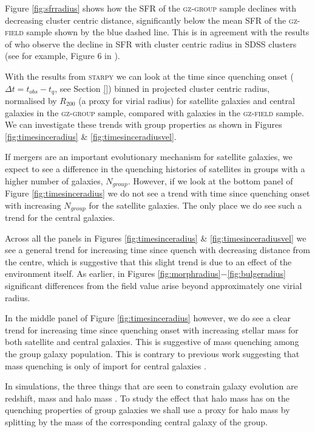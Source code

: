 \documentclass[useAMS,usenatbib]{mn2e}
\def\starpy ~{\textsc{starpy}}
\begin{document}
Figure \ref{fig:sfrradius} shows how the SFR of the \textsc{gz-group} sample declines with decreasing cluster centric distance, significantly below the mean SFR of the \textsc{gz-field} sample shown by the blue dashed line. This is in agreement with the results of \cite{gomez03} who observe the decline in SFR with cluster centric radius in SDSS clusters (see for example, Figure 6 in \citealt{gomez03}). 

With the results from \starpy~ we can look at the time since quenching onset ($\Delta t = t_{obs} - t_{q}$, see Section \ref{}) binned in projected cluster centric radius, normalised by $R_{200}$ (a proxy for virial radius) for satellite galaxies and central galaxies in the \textsc{gz-group} sample, compared with galaxies in the \textsc{gz-field} sample. We can investigate these trends with group properties as shown in Figures \ref{fig:timesinceradius} \& \ref{fig:timesinceradiusvel}. 

If mergers are an important evolutionary mechanism for satellite galaxies, we expect to see a difference in the quenching histories of satellites in groups with a higher number of galaxies, $N_{group}$. However, if we look at the bottom panel of Figure \ref{fig:timesinceradius} we do not see a trend with time since quenching onset with increasing $N_{group}$ for the satellite galaxies. The only place we do see such a trend for the central galaxies. 

Across all the panels in Figures \ref{fig:timesinceradius} \& \ref{fig:timesinceradiusvel} we see a general trend for increasing time since quench with decreasing distance from the centre, which is suggestive that this slight trend is due to an effect of the environment itself. As earlier, in Figures \ref{fig:morphradius}$-$\ref{fig:bulgeradius} significant differences from the field value arise beyond approximately one virial radius. 

In the middle panel of Figure \ref{fig:timesinceradius} however, we do see a clear trend for increasing time since quenching onset with increasing stellar mass for both satellite and central galaxies. This is suggestive of mass quenching among the group galaxy population. This is contrary to previous work suggesting that mass quenching is only of import for central galaxies \citep{ref, ref, ref}. 

In simulations, the three things that are seen to constrain galaxy evolution are redshift, mass and halo mass \cite{ref, ref}. To study the effect that halo mass has on the quenching properties of group galaxies we shall use a proxy for halo mass by splitting by the mass of the corresponding central galaxy of the group.
\end{document}
